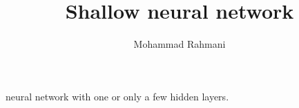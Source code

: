 \documentclass[a4paper]{article}
\title{Shallow neural network}
\date{}
\author{Mohammad Rahmani}
\begin{document}
   \maketitle
   neural network with one or only a few hidden layers.

   
   
\end{document}
